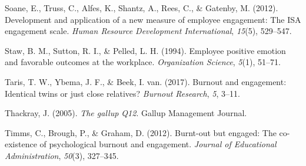 \documentclass[
  man]{apa6}
\newlength{\cslhangindent}
\newlength{\cslentryspacingunit} %
\newenvironment{CSLReferences}[2] %
 {%
  \setlength{\parindent}{0pt}
  \ifodd #1
  \let\oldpar\par
  \def\par{\hangindent=\cslhangindent\oldpar}
  \fi
  \setlength{\parskip}{#2\cslentryspacingunit}
 }%
 {}
\begin{document}
\begin{CSLReferences}{1}{0}
\leavevmode{}%
Soane, E., Truss, C., Alfes, K., Shantz, A., Rees, C., \& Gatenby, M. (2012). Development and application of a new measure of employee engagement: The ISA engagement scale. \emph{Human Resource Development International}, \emph{15}(5), 529--547.

\leavevmode{}%
Staw, B. M., Sutton, R. I., \& Pelled, L. H. (1994). Employee positive emotion and favorable outcomes at the workplace. \emph{Organization Science}, \emph{5}(1), 51--71.

\leavevmode{}%
Taris, T. W., Ybema, J. F., \& Beek, I. van. (2017). Burnout and engagement: Identical twins or just close relatives? \emph{Burnout Research}, \emph{5}, 3--11.

\leavevmode{}%
Thackray, J. (2005). \emph{The gallup Q12}. Gallup Management Journal.

\leavevmode{}%
Timms, C., Brough, P., \& Graham, D. (2012). Burnt-out but engaged: The co-existence of psychological burnout and engagement. \emph{Journal of Educational Administration}, \emph{50}(3), 327--345.

\end{CSLReferences}
\end{document}
